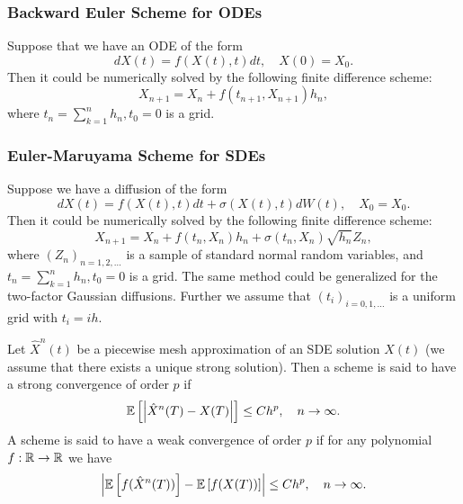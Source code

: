            \subsubsection{Backward Euler Scheme for ODEs}
                Suppose that we have an ODE of the form
                \begin{equation}
                    dX(t) = f(X(t), t)dt, \quad X(0) = X_0. \label{eq:ode2}
                \end{equation}
                Then it could be numerically solved by the following finite difference scheme:
                \begin{equation}
                    X_{n+1} = X_n + f(t_{n+1}, X_{n+1})h_n, \label{Backward:Euler:ODE}
                \end{equation}
                where $t_n = \sum_{k=1}^n h_n, t_0 = 0$ is a grid.

            \subsubsection{Euler-Maruyama Scheme for SDEs}
                Suppose we have a diffusion of the form 
                \begin{equation*}
                    dX(t) = f(X(t), t)dt + \sigma(X(t), t)dW(t), \quad X_0 = X_0.
                \end{equation*}
                Then it could be numerically solved by the following finite difference scheme:
                \begin{equation}
                    X_{n+1} = X_n + f(t_n, X_n)h_n + \sigma(t_n, X_n) \sqrt{h_n} Z_n, \label{Euler:SDE}
                \end{equation}
                where $(Z_n)_{n=1, 2, \dots}$ is a sample of standard normal random variables, and $t_n = \sum_{k=1}^n h_n, t_0 = 0$ is a grid.
                The same method could be generalized for the two-factor Gaussian diffusions. Further we assume
                that $(t_i)_{i = 0, 1, \dots}$ is a uniform grid with $t_i = ih$.

                \begin{definition}
                    Let $\hat X^n(t)$ be a piecewise mesh approximation of an SDE solution $X(t)$ (we assume that 
                    there exists a unique strong solution). 
                    Then a scheme is said to have a strong convergence of order $p$ if 
                    \begin{equation}
                        \mathbb{E}\left[\left|\hat X^n(T) - X(T)\right|\right] \leq Ch^p, \quad n \to \infty.
                    \end{equation}
                    A scheme is said to have a weak convergence of order $p$ if for any polynomial $f: \mathbb{R} \to \mathbb{R}$ we have
                    \begin{equation}
                        \left|\mathbb{E}\left[f(\hat X^n(T))\right] - \mathbb{E}\left[f(X(T))\right]\right| \leq Ch^p, \quad n \to \infty.
                    \end{equation}
                \end{definition}

